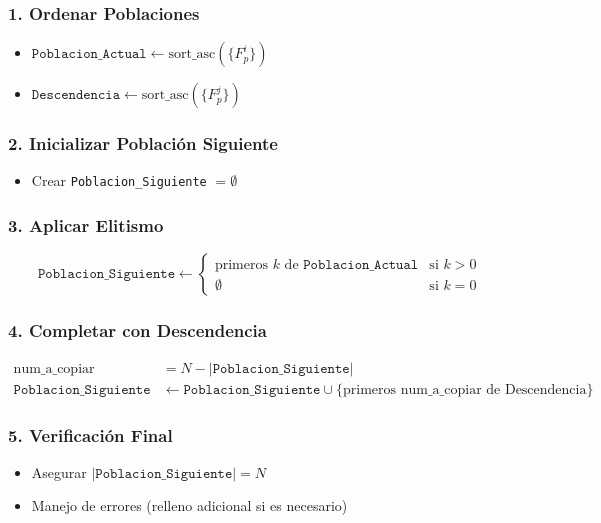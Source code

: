 \subsubsection*{1. Ordenar Poblaciones}
\begin{itemize}
    \item $\texttt{Poblacion\_Actual} \leftarrow \text{sort\_asc}(\{F_p^i\})$
    \item $\texttt{Descendencia} \leftarrow \text{sort\_asc}(\{F_p^j\})$
\end{itemize}

\subsubsection*{2. Inicializar Población Siguiente}
\begin{itemize}
    \item Crear \texttt{Poblacion\_Siguiente} $= \emptyset$
\end{itemize}

\subsubsection*{3. Aplicar Elitismo}
\begin{equation*}
    \texttt{Poblacion\_Siguiente} \leftarrow \begin{cases}
    \text{primeros } k \text{ de } \texttt{Poblacion\_Actual} & \text{si } k > 0 \\
    \emptyset & \text{si } k = 0
    \end{cases}
\end{equation*}

\subsubsection*{4. Completar con Descendencia}
\begin{align*}
    \text{num\_a\_copiar} &= N - |\texttt{Poblacion\_Siguiente}| \\
    \texttt{Poblacion\_Siguiente} &\leftarrow \texttt{Poblacion\_Siguiente} \cup \{\text{primeros num\_a\_copiar de Descendencia}\}
\end{align*}

\subsubsection*{5. Verificación Final}
\begin{itemize}
    \item Asegurar $|\texttt{Poblacion\_Siguiente}| = N$
    \item Manejo de errores (relleno adicional si es necesario)
\end{itemize}

